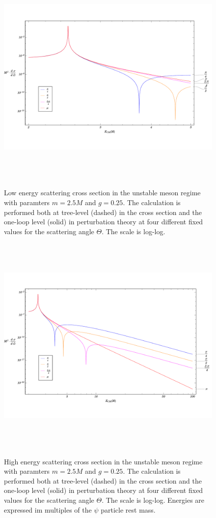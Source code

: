 \documentclass{article}
\begin{document}
\begin{figure}
\begin{center}
\vspace*{-2cm}
\includegraphics[width=15cm, height=11cm]{UnStableMeson-LowEnergy}
\caption{Low energy scattering cross section in the unstable meson regime with paramters $m = 2.5 M$ and $g = 0.25$. The calculation is performed both at tree-level (dashed) in the cross section and the one-loop level (solid) in perturbation theory at four different fixed values for the scattering angle $\Theta$. The scale is log-log.} 
\label{UnStabLowEnergy}
\includegraphics[width=15cm, height=11cm]{UnStableMeson-HighEnergy}
\caption{High energy scattering cross section in the unstable meson regime with paramters $m = 2.5 M$ and $g = 0.25$. The calculation is performed both at tree-level (dashed) in the cross section and the one-loop level (solid) in perturbation theory at four different fixed values for the scattering angle $\Theta$. The scale is log-log. Energies are expressed im multiples of the $\psi$ particle rest mass.} 
\label{UnStabHighEnergy}
\end{center}
\end{figure} 
\end{document}
